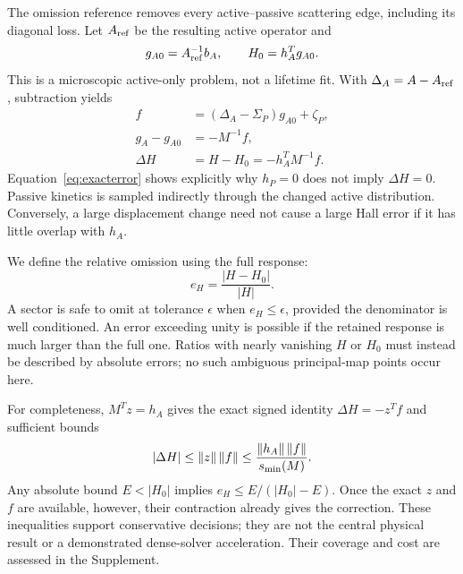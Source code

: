 The omission reference removes every active--passive scattering edge, including its diagonal loss. Let $A_{\rm ref}$ be the resulting active operator and
\begin{equation}
g_{A0}=A_{\rm ref}^{-1}b_A,\qquad H_0=h_A^Tg_{A0}.
\end{equation}
This is a microscopic active-only problem, not a lifetime fit. With $\Delta_A=A-A_{\rm ref}$, subtraction yields
\begin{align}
f&=(\Delta_A-\Sigma_P)g_{A0}+\zeta_P,\\
g_A-g_{A0}&=-M^{-1}f,\\
\Delta H&=H-H_0=-h_A^TM^{-1}f.\label{eq:exacterror}
\end{align}
Equation~\eqref{eq:exacterror} shows explicitly why $h_P=0$ does not imply $\Delta H=0$. Passive kinetics is sampled indirectly through the changed active distribution. Conversely, a large displacement change need not cause a large Hall error if it has little overlap with $h_A$.

We define the relative omission using the full response:
\begin{equation}
e_H=\frac{|H-H_0|}{|H|}.\label{eq:error}
\end{equation}
A sector is safe to omit at tolerance $\epsilon$ when $e_H\leq\epsilon$, provided the denominator is well conditioned. An error exceeding unity is possible if the retained response is much larger than the full one. Ratios with nearly vanishing $H$ or $H_0$ must instead be described by absolute errors; no such ambiguous principal-map points occur here.

For completeness, $M^Tz=h_A$ gives the exact signed identity $\Delta H=-z^Tf$ and sufficient bounds
\begin{equation}
|\Delta H|\leq\left\lVert z\right\rVert\left\lVert f\right\rVert
\leq\frac{\left\lVert h_A\right\rVert\left\lVert f\right\rVert}{s_{\min}(M)}.
\end{equation}
Any absolute bound $E<|H_0|$ implies $e_H\leq E/(|H_0|-E)$. Once the exact $z$ and $f$ are available, however, their contraction already gives the correction. These inequalities support conservative decisions; they are not the central physical result or a demonstrated dense-solver acceleration. Their coverage and cost are assessed in the Supplement.
